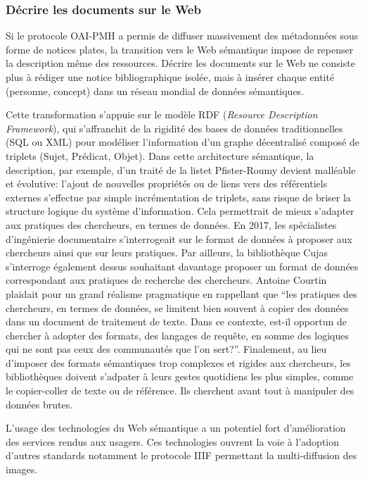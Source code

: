 \subsubsection{Décrire les documents sur le Web}
Si le protocole OAI-PMH a permis de diffuser massivement des métadonnées sous forme de notices plates, la transition vers le Web sémantique impose de repenser la description même des ressources. Décrire les documents sur le Web ne consiste plus à rédiger une notice bibliographique isolée, mais à insérer chaque entité (personne, concept) dans un réseau mondial de données sémantiques. 

Cette transformation s'appuie sur le modèle RDF (\textit{Resource Description Framework}), qui s'affranchit de la rigidité des bases de données traditionnelles (SQL ou XML) pour modéliser l'information d'un graphe décentralisé composé de triplets (Sujet, Prédicat, Objet). Dans cette architecture sémantique, la description, par exemple, d'un traité de la listet Pfister-Roumy devient malléable et évolutive: l'ajout de nouvelles propriétés ou de liens vers des référentiels externes s'effectue par simple incrémentation de triplets, sans risque de briser la structure logique du système d'information. Cela permettrait de mieux s'adapter aux pratiques des chercheurs, en termes de données. En 2017, les spécialistes d'ingénierie documentaire s'interrogeait sur le format de données à proposer aux chercheurs ainsi que sur leurs pratiques. Par ailleurs, la bibliothèque Cujas s'interroge également dessus souhaitant davantage proposer un format de données correspondant aux pratiques de recherche des chercheurs. Antoine Courtin plaidait pour un grand réalisme pragmatique en rappellant que \enquote{les pratiques des chercheurs, en termes de données, se limitent bien souvent à copier des données dans un document de traitement de texte. Dans ce contexte, est-il opportun de chercher à adopter des formats, des langages de requête, en somme des logiques qui ne sont pas ceux des communautés que l'on sert?}. Finalement, au lieu d'imposer des formats sémantiques trop complexes et rigides aux chercheurs, les bibliothèques doivent s'adpater à leurs gestes quotidiens les plus simples, comme le copier-coller de texte ou de référence. Ils cherchent avant tout à manipuler des données brutes. 

L'usage des technologies du Web sémantique a un potentiel fort d'amélioration des services rendus aux usagers. Ces technologies ouvrent la voie à l'adoption d'autres standards notamment le protocole IIIF permettant la multi-diffusion des images. 

